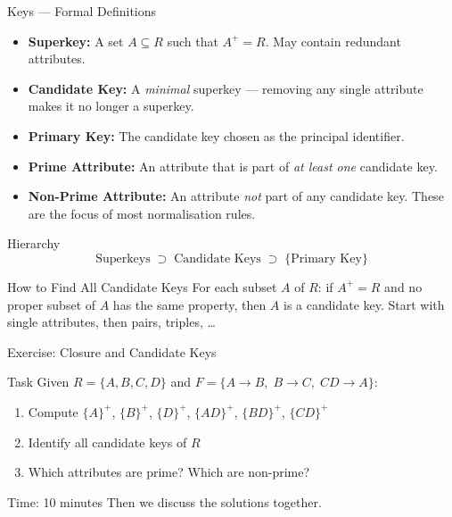 \begin{frame}{Keys --- Formal Definitions}
  \begin{itemize}
    \item \textbf{Superkey:} A set $A \subseteq R$ such that $A^+ = R$.
          May contain redundant attributes.
    \item \textbf{Candidate Key:} A \emph{minimal} superkey --- removing any
          single attribute makes it no longer a superkey.
    \item \textbf{Primary Key:} The candidate key chosen as the principal identifier.
    \item \textbf{Prime Attribute:} An attribute that is part of \emph{at least one} candidate key.
    \item \textbf{Non-Prime Attribute:} An attribute \emph{not} part of any candidate key.
          These are the focus of most normalisation rules.
  \end{itemize}

  \begin{block}{Hierarchy}
    \[ \text{Superkeys} \;\supset\; \text{Candidate Keys} \;\supset\; \{\text{Primary Key}\} \]
  \end{block}

  \begin{alertblock}{How to Find All Candidate Keys}
    For each subset $A$ of $R$: if $A^+ = R$ and no proper subset of $A$ has
    the same property, then $A$ is a candidate key.
    Start with single attributes, then pairs, triples, \ldots
  \end{alertblock}
\end{frame}

\begin{frame}{Exercise: Closure and Candidate Keys}
  \begin{block}{Task}
    Given $R = \{A, B, C, D\}$ and $F = \{A \to B,\; B \to C,\; CD \to A\}$:
    \begin{enumerate}
      \item Compute $\{A\}^+$, $\{B\}^+$, $\{D\}^+$, $\{AD\}^+$, $\{BD\}^+$, $\{CD\}^+$
      \item Identify all candidate keys of $R$
      \item Which attributes are prime? Which are non-prime?
    \end{enumerate}
  \end{block}

  \begin{alertblock}{Time: 10 minutes}
    Then we discuss the solutions together.
  \end{alertblock}
\end{frame}
